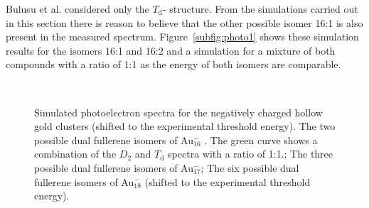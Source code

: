 Bulusu et al. considered only the $T_\text{d}$- structure. From the
simulations carried out in this section there is reason to believe that the
other possible isomer 16:1 is also present in the measured spectrum.
Figure~\ref{subfig:photo1} shows these simulation results for the isomers 16:1
and 16:2 and a simulation for a mixture of both compounds with a ratio of 1:1 as
the energy of both isomers are comparable. 
%
\begin{figure}[htb]
    \begin{center}
        \hfill
        \\
    \caption{Simulated photoelectron spectra for the negatively charged hollow gold
        clusters (shifted to the experimental threshold energy).
        \protect{} The two possible dual fullerene isomers of
        Au$_{16}^-$ . The green curve shows a combination of the $D_\mathrm{2}$ and
        $T_\mathrm{d}$ spectra with a ratio of 1:1.; \protect{}
        The three possible dual fullerene isomers of Au$_{17}^-$;
        \protect{} The six possible dual fullerene isomers of
        Au$_{18}^-$ (shifted to the experimental threshold energy).}
      \label{fig:photo_Au16}
    \end{center}
    \end{figure}
